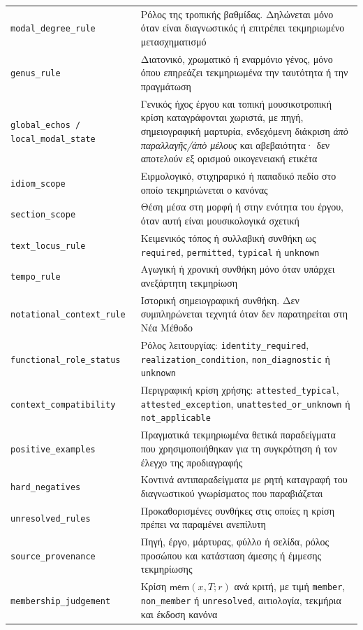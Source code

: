 \documentclass[11pt,a4paper]{article}
\begin{document}
{\begin{xltabular}{\textwidth}{@{}p{0.27\textwidth}Y@{}}
\texttt{modal\_degree\_rule} & Ρόλος της τροπικής βαθμίδας. Δηλώνεται μόνο όταν είναι διαγνωστικός ή επιτρέπει τεκμηριωμένο μετασχηματισμό\\
\texttt{genus\_rule} & Διατονικό, χρωματικό ή εναρμόνιο γένος, μόνο όπου επηρεάζει τεκμηριωμένα την ταυτότητα ή την πραγμάτωση\\
\texttt{global\_echos / local\_modal\_state} & Γενικός ήχος έργου και τοπική μουσικοτροπική κρίση καταγράφονται χωριστά, με πηγή, σημειογραφική μαρτυρία, ενδεχόμενη διάκριση \emph{ἀπὸ παραλλαγῆς/ἀπὸ μέλους} και αβεβαιότητα· δεν αποτελούν εξ ορισμού οικογενειακή ετικέτα\\
\texttt{idiom\_scope} & Ειρμολογικό, στιχηραρικό ή παπαδικό πεδίο στο οποίο τεκμηριώνεται ο κανόνας\\
\texttt{section\_scope} & Θέση μέσα στη μορφή ή στην ενότητα του έργου, όταν αυτή είναι μουσικολογικά σχετική\\
\texttt{text\_locus\_rule} & Κειμενικός τόπος ή συλλαβική συνθήκη ως \texttt{required}, \texttt{permitted}, \texttt{typical} ή \texttt{unknown}\\
\texttt{tempo\_rule} & Αγωγική ή χρονική συνθήκη μόνο όταν υπάρχει ανεξάρτητη τεκμηρίωση\\
\texttt{notational\_context\_rule} & Ιστορική σημειογραφική συνθήκη. Δεν συμπληρώνεται τεχνητά όταν δεν παρατηρείται στη Νέα Μέθοδο\\
\texttt{functional\_role\_status} & Ρόλος λειτουργίας: \texttt{identity\_required}, \texttt{realization\_condition}, \texttt{non\_diagnostic} ή \texttt{unknown}\\
\texttt{context\_compatibility} & Περιγραφική κρίση χρήσης: \texttt{attested\_typical}, \texttt{attested\_exception}, \texttt{unattested\_or\_unknown} ή \texttt{not\_applicable}\\
\texttt{positive\_examples} & Πραγματικά τεκμηριωμένα θετικά παραδείγματα που χρησιμοποιήθηκαν για τη συγκρότηση ή τον έλεγχο της προδιαγραφής\\
\texttt{hard\_negatives} & Κοντινά αντιπαραδείγματα με ρητή καταγραφή του διαγνωστικού γνωρίσματος που παραβιάζεται\\
\texttt{unresolved\_rules} & Προκαθορισμένες συνθήκες στις οποίες η κρίση πρέπει να παραμένει ανεπίλυτη\\
\texttt{source\_provenance} & Πηγή, έργο, μάρτυρας, φύλλο ή σελίδα, ρόλος προσώπου και κατάσταση άμεσης ή έμμεσης τεκμηρίωσης\\
\texttt{membership\_judgement} & Κρίση $\mathsf{mem}(x,T;r)$ ανά κριτή, με τιμή \texttt{member}, \texttt{non\_member} ή \texttt{unresolved}, αιτιολογία, τεκμήρια και έκδοση κανόνα\\

\end{xltabular}}
\end{document}

